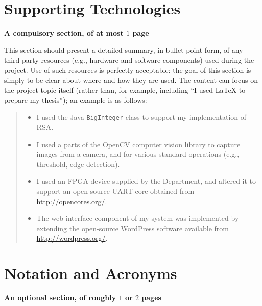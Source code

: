 \documentclass[ %
                    author={Luke Murray},
                supervisor={Dr. Simon Hollis},
                     title={Shadow Peer-to-Peer Networks},
                  subtitle={},
                    degree={MEng},
                      year={2013} ]{thesis}
\begin{document}


\chapter*{Supporting Technologies}

{\bf A compulsory section, of at most $1$ page}
\vspace{1cm} 

\noindent
This section should present a detailed summary, in bullet point form, of 
any third-party resources (e.g., hardware and software components) used 
during the project.  Use of such resources is perfectly acceptable: the 
goal of this section is simply to be clear about where and how they are 
used.  The content can focus on the project topic itself (rather than, 
for example, including ``I used \mbox{\LaTeX} to prepare my thesis''); 
an example is as follows:

\begin{quote}
\noindent
\begin{itemize}
\item I used the Java {\tt BigInteger} class to support my implementation 
      of RSA.
\item I used a parts of the OpenCV computer vision library to capture 
      images from a camera, and for various standard operations (e.g., 
      threshold, edge detection).
\item I used an FPGA device supplied by the Department, and altered it 
      to support an open-source UART core obtained from 
      \url{http://opencores.org/}.
\item The web-interface component of my system was implemented by 
      extending the open-source WordPress software available from
      \url{http://wordpress.org/}.
\end{itemize}
\end{quote}


\chapter*{Notation and Acronyms}

{\bf An optional section, of roughly $1$ or $2$ pages}
\vspace{1cm} 
\end{document}
